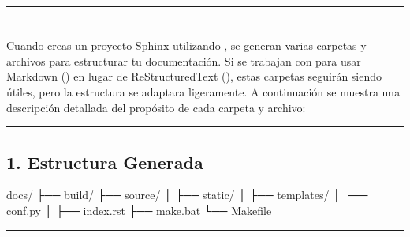 \documentclass[a4paper,10pt,oneside,spanish,openany]{sphinxmanual}
\begin{document}
\bigskip\hrule\bigskip


\sphinxstepscope


\section{}
\label{\detokenize{configuracion_inicial/004.estructura_inicial_proyecto:estructura-inicial-del-proyecto}}\label{\detokenize{configuracion_inicial/004.estructura_inicial_proyecto::doc}}
\sphinxAtStartPar
Cuando creas un proyecto Sphinx utilizando , se generan varias carpetas y archivos para estructurar tu documentación. Si se trabajan con  para usar Markdown () en lugar de ReStructuredText (), estas carpetas seguirán siendo útiles, pero la estructura se adaptara ligeramente. A continuación se muestra una descripción detallada del propósito de cada carpeta y archivo:


\bigskip\hrule\bigskip



\subsection{1. Estructura Generada}
\label{\detokenize{configuracion_inicial/004.estructura_inicial_proyecto:estructura-generada}}
\begin{sphinxVerbatim}[commandchars=\\\{\}]
docs/
├── build/
├── source/
│   ├── \PYGZus{}static/
│   ├── \PYGZus{}templates/
│   ├── conf.py
│   ├── index.rst
├── make.bat
└── Makefile
\end{sphinxVerbatim}


\bigskip\hrule\bigskip
\end{document}
